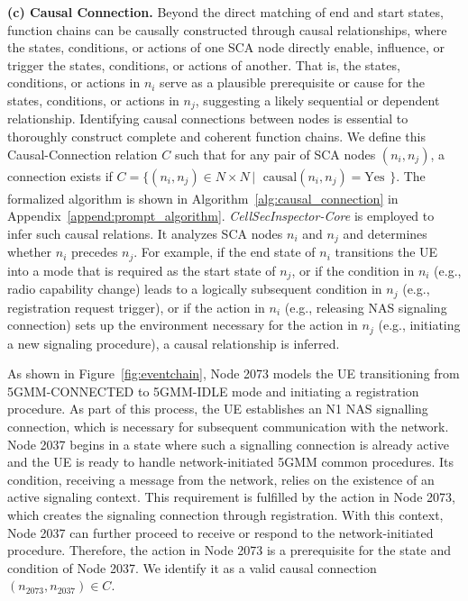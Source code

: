 \documentclass[sigconf]{acmart}
\newcommand{\core}{\textit{CellSecInspector-Core}\xspace}
\begin{document}
{\noindent \textbf{(c) \textbf{Causal Connection.}}
Beyond the direct matching of end and start states, function chains can be causally constructed through causal relationships, where the states, conditions, or actions of one SCA node directly enable, influence, or trigger the states, conditions, or actions of another.  
That is, the states, conditions, or actions in $n_i$ serve as a plausible prerequisite or cause for the states, conditions, or actions in $n_j$, suggesting a likely sequential or dependent relationship. 
Identifying causal connections between nodes is essential to thoroughly construct complete and coherent function chains. 
We define this Causal-Connection relation $C$ such that for any pair of SCA nodes $(n_i, n_j)$, a connection exists if $ C = \{ (n_i, n_j) \in N \times N \, |\ \begin{array}{l}
\text{causal}(n_i, n_j) = \text{Yes}
\end{array}
\}$. 
The formalized algorithm is shown in Algorithm~\ref{alg:causal_connection} in Appendix~\ref{append:prompt_algorithm}.
\core is employed to infer such causal relations. 
It analyzes SCA nodes $n_i$ and $n_j$ and determines whether $n_i$ precedes $n_j$. For example, if the end state of $n_i$ transitions the UE into a mode that is required as the start state of $n_j$, or if the condition in $n_i$ (e.g., radio capability change) leads to a logically subsequent condition in $n_j$ (e.g., registration request trigger), or if the action in $n_i$ (e.g., releasing NAS signaling connection) sets up the environment necessary for the action in $n_j$ (e.g., initiating a new signaling procedure), a causal relationship is inferred.


As shown in Figure~\ref{fig:eventchain}, Node 2073 models the UE transitioning from 5GMM-CONNECTED to 5GMM-IDLE mode and initiating a registration procedure. As part of this process, the UE establishes an N1 NAS signalling connection, which is necessary for subsequent communication with the network. 
Node 2037 begins in a state where such a signalling connection is already active and the UE is ready to handle network-initiated 5GMM common procedures. 
Its condition, receiving a message from the network, relies on the existence of an active signaling context. 
This requirement is fulfilled by the action in Node 2073, which creates the signaling connection through registration. With this context, Node 2037 can further proceed to receive or respond to the network-initiated procedure. 
Therefore, the action in Node 2073 is a prerequisite for the state and condition of Node 2037. We identify it as a valid causal connection $(n_{2073}, n_{2037}) \in C$.  

}
\end{document}
